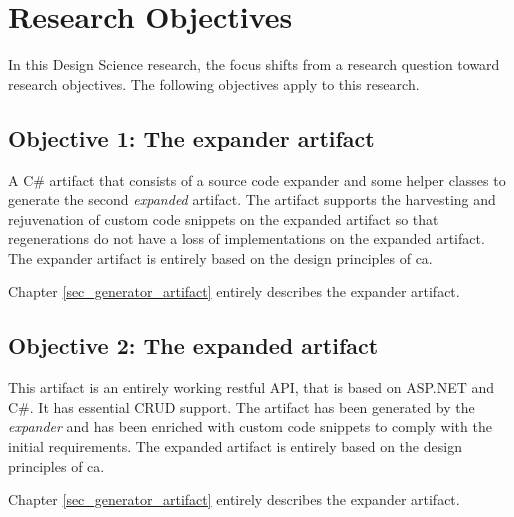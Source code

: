 \section{Research Objectives} \label{sec_research_objectives}

In this Design Science research, the focus shifts from a research question toward
research objectives. The following objectives apply to this research.

\subsection*{Objective 1: The expander artifact}
A C\# artifact that consists of a source code expander and some helper classes to
generate the second \emph{expanded} artifact. The artifact supports the harvesting and
rejuvenation of custom code snippets on the expanded artifact so that regenerations do not
have a loss of implementations on the expanded artifact. The expander artifact is entirely
based on the design principles of \gls{ca}.

Chapter \ref{sec_generator_artifact} entirely describes the expander artifact.

\subsection*{Objective 2: The expanded artifact}
This artifact is an entirely working restful API, that is based on ASP.NET and C\#. It has
essential CRUD support. The artifact has been generated by the \emph{expander} and has
been enriched with custom code snippets to comply with the initial requirements.
The expanded artifact is entirely based on the design principles of \gls{ca}.

Chapter \ref{sec_generator_artifact} entirely describes the expander artifact.

